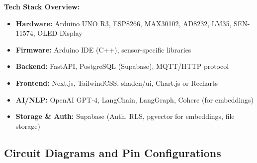 \textbf{Tech Stack Overview:}

\begin{itemize}
    \item \textbf{Hardware:} Arduino UNO R3, ESP8266, MAX30102, AD8232, LM35, SEN-11574, OLED Display
    \item \textbf{Firmware:} Arduino IDE (C++), sensor-specific libraries
    \item \textbf{Backend:} FastAPI, PostgreSQL (Supabase), MQTT/HTTP protocol
    \item \textbf{Frontend:} Next.js, TailwindCSS, shadcn/ui, Chart.js or Recharts
    \item \textbf{AI/NLP:} OpenAI GPT-4, LangChain, LangGraph, Cohere (for embeddings)
    \item \textbf{Storage \& Auth:} Supabase (Auth, RLS, pgvector for embeddings, file storage)
\end{itemize}

\subsection{Circuit Diagrams and Pin Configurations}

